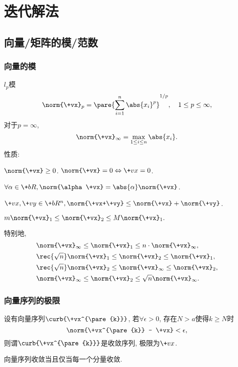 \documentclass[hidelinks]{ctexart}
\begin{document}
\section{迭代解法} %
\label{sec:迭代解法}

\subsection{向量/矩阵的模/范数} %
\label{sub:向量_矩阵的模_范数}

\subsubsection{向量的模} %
\label{ssub:向量的模}

$l_p$模
\[ \norm{\+vx}_p = \pare{\sum_{i=1}^n \abs{x_i}^p}^{1/p},\quad 1\le p \le \infty, \]
对于$p=\infty$,
\[ \norm{\+vx}_\infty = \max_{1\le i\le n}\abs{x_i}. \]
性质:
\begin{cenum}
    \item $\norm{\+vx} \ge 0$. $\norm{\+vx} = 0 \Leftrightarrow \+vx = 0$.
    \item $\forall \alpha \in \+bR, \norm{\alpha \+vx} = \abs{\alpha}\norm{\+vx}$.
    \item $\+vx,\+vy\in \+bR^n, \norm{\+vx+\+vy} \le \norm{\+vx} + \norm{\+vy}$.
    \item $m\norm{\+vx}_1 \le \norm{\+vx}_2 \le M\norm{\+vx}_1.$
\end{cenum}
特别地,
\begin{align*}
    & \norm{\+vx}_\infty \le \norm{\+vx}_1 \le n\cdot \norm{\+vx}_\infty, \\
    & \rec{\sqrt{n}} \norm{\+vx}_1 \le \norm{\+vx}_2 \le \norm{\+vx}_1, \\
    & \rec{\sqrt{n}} \norm{\+vx}_2 \le \norm{\+vx}_\infty \le \norm{\+vx}_2, \\
    & \norm{\+vx}_\infty \le \norm{\+vx}_2 \le \sqrt{n}\norm{\+vx}_\infty.
\end{align*}


\subsubsection{向量序列的极限} %
\label{ssub:向量序列的极限}

设有向量序列$\curb{\+vx^{\pare{k}}}$, 若$\forall \epsilon > 0$, 存在$N>a$使得$k\ge N$时
\[ \norm{\+vx^{\pare{k}} - \+vx}<\epsilon, \]
则谓$\curb{\+vx^{\pare{k}}}$是收敛序列, 极限为$\+vx$.
\begin{lemma}
    向量序列收敛当且仅当每一个分量收敛.
\end{lemma}
\end{document}
